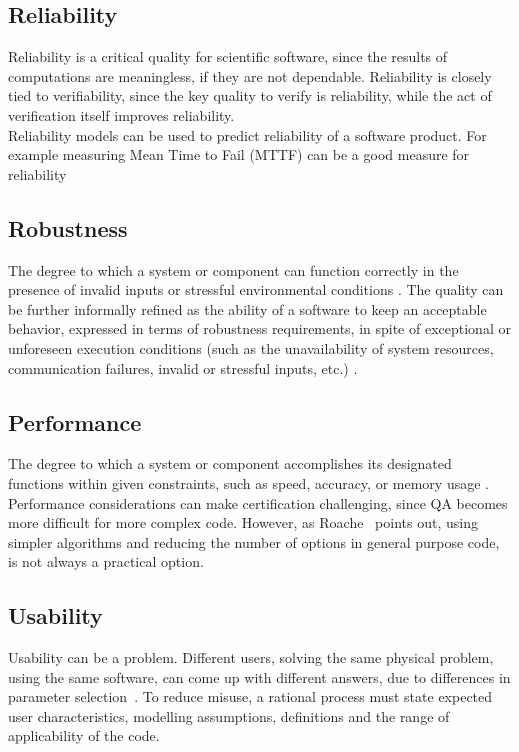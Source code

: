 \documentclass[12pt]{article}
\begin{document}
\subsection{Reliability}

Reliability is a critical quality for scientific software, since the results of
computations are meaningless, if they are not dependable.  Reliability is
closely tied to verifiability, since the key quality to verify is reliability,
while the act of verification itself improves reliability.\\
Reliability models can be used to predict reliability of a software product. For example measuring Mean Time to Fail (MTTF) can be a good measure for reliability

\subsection{Robustness}
The degree to which a system or component can function correctly in the presence of invalid inputs or stressful environmental conditions \cite{IEEEStdGlossarySET1990}.
The quality can be further informally refined as the ability of a software to keep an acceptable behavior, expressed in terms of robustness requirements, in spite of exceptional or unforeseen execution conditions (such as the unavailability of system resources, communication failures, invalid or stressful inputs, etc.) \cite{fernandez2005model}.

\subsection{Performance}

The degree to which a system or component accomplishes its designated functions within given constraints, such as speed, accuracy, or memory usage \cite{IEEEStdGlossarySET1990}.
Performance considerations can make certification challenging, since QA becomes more difficult for more complex code.  However, as Roache~\cite[p.~355]{Roache1998} points out, using simpler algorithms and reducing the number of options in general purpose code, is not always a practical option.

\subsection{Usability}

Usability can be a problem.  Different users, solving the same physical problem,
using the same software, can come up with different answers, due to differences
in parameter selection~\cite[p.~370]{Roache1998}.  To reduce misuse, a rational
process must state expected user characteristics, modelling assumptions,
definitions and the range of applicability of the code.
\end{document}
